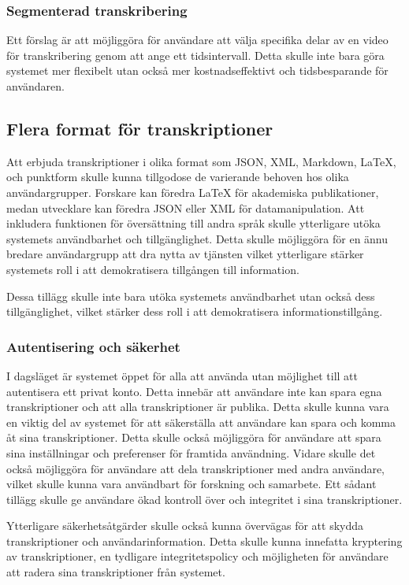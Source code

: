 \subsubsection{Segmenterad transkribering}
Ett förslag är att möjliggöra för användare att
välja specifika delar av en video för transkribering genom att ange ett
tidsintervall. Detta skulle inte bara göra systemet mer flexibelt utan också
mer kostnadseffektivt och tidsbesparande för användaren.

\subsection{Flera format för transkriptioner}
Att erbjuda transkriptioner i olika format
som JSON, XML, Markdown, LaTeX, och punktform skulle kunna tillgodose de
varierande behoven hos olika användargrupper. Forskare kan föredra LaTeX för
akademiska publikationer, medan utvecklare kan föredra JSON eller XML för
datamanipulation. Att inkludera funktionen för översättning till andra språk skulle ytterligare utöka systemets användbarhet och tillgänglighet. Detta skulle möjliggöra för en ännu bredare användargrupp att dra nytta av tjänsten vilket ytterligare stärker systemets roll i att demokratisera tillgången till information.

Dessa tillägg skulle inte bara utöka systemets användbarhet utan också dess
tillgänglighet, vilket stärker dess roll i att demokratisera
informationstillgång.

\subsubsection{Autentisering och säkerhet}
I dagsläget är systemet öppet för alla att använda utan möjlighet till
att autentisera ett privat konto. Detta innebär att användare inte kan spara
egna transkriptioner och att alla transkriptioner är publika. Detta skulle
kunna vara en viktig del av systemet för att säkerställa att användare kan
spara och komma åt sina transkriptioner. Detta skulle också möjliggöra för
användare att spara sina inställningar och preferenser för framtida användning.
Vidare skulle det också möjliggöra för användare att dela transkriptioner med
andra användare, vilket skulle kunna vara användbart för forskning och
samarbete. Ett sådant tillägg skulle ge användare ökad kontroll över och
integritet i sina transkriptioner.

Ytterligare säkerhetsåtgärder skulle också kunna övervägas för att skydda
transkriptioner och användarinformation. Detta skulle kunna innefatta
kryptering av transkriptioner, en tydligare integritetspolicy och möjligheten
för användare att radera sina transkriptioner från systemet.

